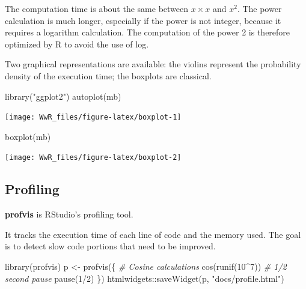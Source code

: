 \documentclass[
  12pt,
  american,
  a4paper,
  extrafontsizes,onecolumn,openright
  ]{memoir}
\newenvironment{Shaded}{\begin{snugshade}}{\end{snugshade}}
\newcommand{\CommentTok}[1]{\textcolor[rgb]{0.56,0.35,0.01}{\textit{#1}}}
\newcommand{\DecValTok}[1]{\textcolor[rgb]{0.00,0.00,0.81}{#1}}
\newcommand{\FunctionTok}[1]{\textcolor[rgb]{0.00,0.00,0.00}{#1}}
\newcommand{\NormalTok}[1]{#1}
\newcommand{\OtherTok}[1]{\textcolor[rgb]{0.56,0.35,0.01}{#1}}
\newcommand{\SpecialCharTok}[1]{\textcolor[rgb]{0.00,0.00,0.00}{#1}}
\newcommand{\StringTok}[1]{\textcolor[rgb]{0.31,0.60,0.02}{#1}}
\begin{document}
\normalsize

The computation time is about the same between \(x \times x\) and \(x^2\).
The power calculation is much longer, especially if the power is not integer, because it requires a logarithm calculation.
The computation of the power 2 is therefore optimized by R to avoid the use of log.

Two graphical representations are available: the violins represent the probability density of the execution time; the boxplots are classical.

\scriptsize

\begin{Shaded}
\begin{Highlighting}[]
\FunctionTok{library}\NormalTok{(}\StringTok{"ggplot2"}\NormalTok{)}
\FunctionTok{autoplot}\NormalTok{(mb)}
\end{Highlighting}
\end{Shaded}

\begin{center}\texttt{[image: WwR\_files/figure-latex/boxplot-1]} \end{center}

\begin{Shaded}
\begin{Highlighting}[]
\FunctionTok{boxplot}\NormalTok{(mb)}
\end{Highlighting}
\end{Shaded}

\begin{center}\texttt{[image: WwR\_files/figure-latex/boxplot-2]} \end{center}

\normalsize

\hypertarget{profiling}{%
\subsection{Profiling}\label{profiling}}

\textbf{profvis} is RStudio's profiling tool.

It tracks the execution time of each line of code and the memory used.
The goal is to detect slow code portions that need to be improved.

\scriptsize

\begin{Shaded}
\begin{Highlighting}[]
\FunctionTok{library}\NormalTok{(profvis)}
\NormalTok{p }\OtherTok{\textless{}{-}} \FunctionTok{profvis}\NormalTok{(\{}
    \CommentTok{\# Cosine calculations}
    \FunctionTok{cos}\NormalTok{(}\FunctionTok{runif}\NormalTok{(}\DecValTok{10}\SpecialCharTok{\^{}}\DecValTok{7}\NormalTok{))}
    \CommentTok{\# 1/2 second pause}
    \FunctionTok{pause}\NormalTok{(}\DecValTok{1}\SpecialCharTok{/}\DecValTok{2}\NormalTok{)}
\NormalTok{\})}
\NormalTok{htmlwidgets}\SpecialCharTok{::}\FunctionTok{saveWidget}\NormalTok{(p, }\StringTok{"docs/profile.html"}\NormalTok{)}
\end{Highlighting}
\end{Shaded}
\end{document}
